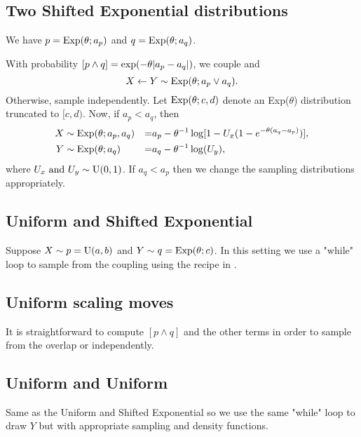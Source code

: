 \documentclass[11pt,a4paper]{article}
\begin{document}
\subsection{Two Shifted Exponential distributions}

We have $ p = \mathrm{Exp}(\theta; a_p) $ and $ q = \mathrm{Exp}(\theta; a_q) $.

With probability $ [p \wedge q] = \exp(-\theta \lvert a_p - a_q\rvert) $, we couple and
\[
X \leftarrow Y \sim \mathrm{Exp}(\theta; a_p \vee a_q).
\]
Otherwise, sample independently. Let $ \mathrm{Exp}(\theta; c, d) $ denote an Exp($ \theta $) distribution truncated to $ [c, d) $. Now, if $ a_p < a_q $, then
\begin{alignat*}{3}
    X &\sim \mathrm{Exp}(\theta; a_p, a_q)
        &=& a_p - \theta^{-1} \log[1 - U_x (1 - e^{-\theta (a_q - a_p)})], \\
    Y &\sim \mathrm{Exp}(\theta; a_q)
        &=& a_q - \theta^{-1} \log(U_y),
\end{alignat*}
where $ U_x \text{ and } U_y \sim \mathrm{U}(0, 1) $. If $ a_q < a_p $ then we change the sampling distributions appropriately.

\subsection{Uniform and Shifted Exponential}

Suppose $ X \sim p = \mathrm{U}(a, b) $ and $ Y \sim q = \mathrm{Exp}(\theta; c) $. In this setting we use a "while" loop to sample from the coupling using the recipe in \citet{jacob20}.

\subsection{Uniform scaling moves}

It is straightforward to compute $ [p \wedge q] $ and the other terms in order to sample from the overlap or independently.

\subsection{Uniform and Uniform}

Same as the Uniform and Shifted Exponential so we use the same "while" loop to draw $ Y $ but with appropriate sampling and density functions.

%
%
\end{document}
